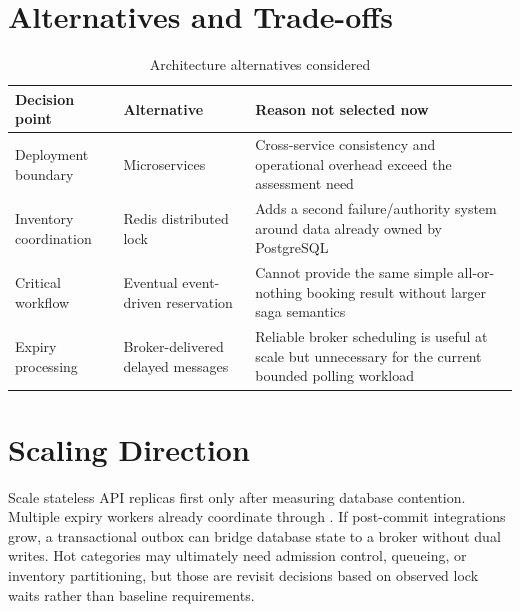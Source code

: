 \section{Alternatives and Trade-offs}
\begin{table}[H]
\centering
\caption{Architecture alternatives considered}
\begin{tabularx}{\textwidth}{p{}p{}Y}
\toprule
\textbf{Decision point} & \textbf{Alternative} & \textbf{Reason not selected now} \\
\midrule
Deployment boundary & Microservices & Cross-service consistency and operational overhead exceed the assessment need \\
Inventory coordination & Redis distributed lock & Adds a second failure/authority system around data already owned by PostgreSQL \\
Critical workflow & Eventual event-driven reservation & Cannot provide the same simple all-or-nothing booking result without larger saga semantics \\
Expiry processing & Broker-delivered delayed messages & Reliable broker scheduling is useful at scale but unnecessary for the current bounded polling workload \\
\bottomrule
\end{tabularx}
\end{table}

\section{Scaling Direction}
Scale stateless API replicas first only after measuring database contention.
Multiple expiry workers already coordinate through . If post-commit integrations grow, a transactional outbox can bridge
database state to a broker without dual writes. Hot categories may ultimately
need admission control, queueing, or inventory partitioning, but those are
revisit decisions based on observed lock waits rather than baseline
requirements.
